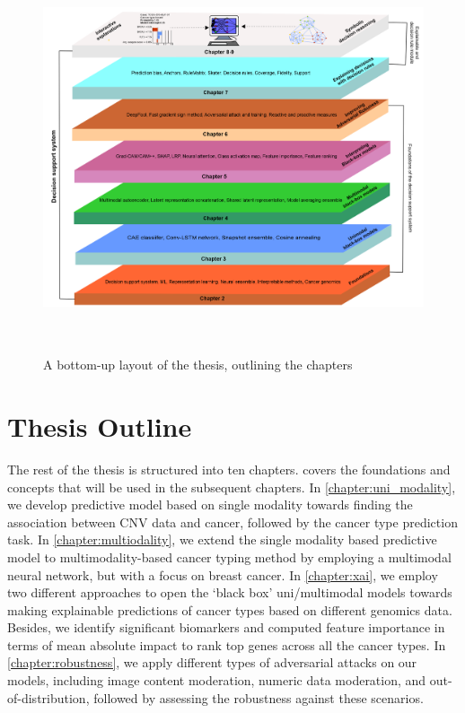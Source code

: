 \begin{figure}
	\centering
		\includegraphics[width=0.9\linewidth,height=115mm]{images/chapter_outline.png}
		\caption{A bottom-up layout of the thesis, outlining the chapters}
        \label{fig:chapter_organization}
\end{figure}

\section{Thesis Outline} \label{structure}
The rest of the thesis is structured into ten chapters. 
 covers the foundations and concepts that will be used in the subsequent chapters. In \cref{chapter:uni_modality}, we develop predictive model based on single modality towards finding the association between CNV data and cancer, followed by the cancer type prediction task. In \cref{chapter:multiodality}, we extend the single modality based predictive model to multimodality-based cancer typing method by employing a multimodal neural network, but with a focus on breast cancer. In \cref{chapter:xai}, we employ two different approaches to open the `black box' uni/multimodal models towards making explainable predictions of cancer types based on different genomics data. Besides, we identify significant biomarkers and computed feature importance in terms of mean absolute impact to rank top genes across all the cancer types. In \cref{chapter:robustness}, we apply different types of adversarial attacks on our models, including image content moderation, numeric data moderation, and out-of-distribution, followed by assessing the robustness against these scenarios. 

